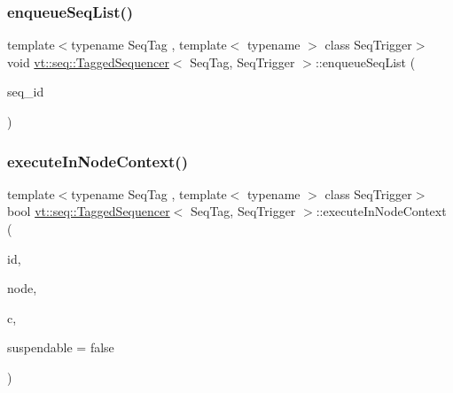\subsubsection{\texorpdfstring{enqueue\+Seq\+List()}{enqueueSeqList()}}
{\footnotesize\ttfamily template$<$typename Seq\+Tag , template$<$ typename $>$ class Seq\+Trigger$>$ \\
void \hyperlink{structvt_1_1seq_1_1_tagged_sequencer}{vt\+::seq\+::\+Tagged\+Sequencer}$<$ Seq\+Tag, Seq\+Trigger $>$\+::enqueue\+Seq\+List (\begin{DoxyParamCaption}\item[{\hyperlink{structvt_1_1seq_1_1_tagged_sequencer_a1c8ee839258d0f88c49ef660267a81d5}{Seq\+Type} const \&}]{seq\+\_\+id }\end{DoxyParamCaption})}

\mbox{\label{structvt_1_1seq_1_1_tagged_sequencer_a22ec2d429c99ca4d34a6b1b0c95c658f}} 
\subsubsection{\texorpdfstring{execute\+In\+Node\+Context()}{executeInNodeContext()}}
{\footnotesize\ttfamily template$<$typename Seq\+Tag , template$<$ typename $>$ class Seq\+Trigger$>$ \\
bool \hyperlink{structvt_1_1seq_1_1_tagged_sequencer}{vt\+::seq\+::\+Tagged\+Sequencer}$<$ Seq\+Tag, Seq\+Trigger $>$\+::execute\+In\+Node\+Context (\begin{DoxyParamCaption}\item[{\hyperlink{structvt_1_1seq_1_1_tagged_sequencer_a1c8ee839258d0f88c49ef660267a81d5}{Seq\+Type} const \&}]{id,  }\item[{\hyperlink{namespacevt_1_1seq_ae6a4874b585be0612aaca32ca6d2d191}{Seq\+Node\+Ptr\+Type}}]{node,  }\item[{\hyperlink{structvt_1_1seq_1_1_tagged_sequencer_ad8a1ed9b8c012cf2a73ebd2e46d6d899}{Seq\+Ctx\+Function\+Type}}]{c,  }\item[{bool const}]{suspendable = {\ttfamily false} }\end{DoxyParamCaption})}

\mbox{\label{structvt_1_1seq_1_1_tagged_sequencer_a7cabb68c124d242fca8c9dcb6fc51ec9}} 
